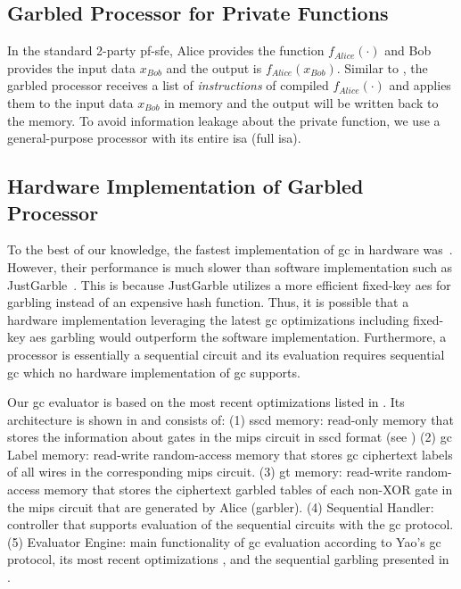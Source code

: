 \subsection{Garbled Processor for Private Functions} \label{ssec:processor-mips-sfe-private}
In the standard 2-party \acrshort{pf-sfe}, Alice provides the function $f_{Alice}(\cdot)$ and Bob provides the input data $x_{Bob}$ and the output is $f_{Alice}(x_{Bob})$.
Similar to , the garbled processor receives a list of \emph{instructions} of compiled $f_{Alice}(\cdot)$ and applies them to the input data $x_{Bob}$ in memory and the output will be written back to the memory.
To avoid information leakage about the private function, we use a general-purpose processor with its entire \acrshort{isa} (full \acrshort{isa}).

\subsection{Hardware Implementation of Garbled Processor} \label{ssec:processor-hardware}
To the best of our knowledge, the fastest implementation of \acrshort{gc} in hardware was~\cite{jarvinen2010garbled}.
However, their performance is much slower than software implementation such as JustGarble~\cite{bellare2013efficient}.
This is because JustGarble utilizes a more efficient fixed-key \acrshort{aes} for garbling instead of an expensive hash function.
Thus, it is possible that a hardware implementation leveraging the latest \acrshort{gc} optimizations including fixed-key \acrshort{aes} garbling would outperform the software implementation.
Furthermore, a processor is essentially a sequential circuit and its evaluation requires sequential \acrshort{gc} which no hardware implementation of \acrshort{gc} supports.

Our \acrshort{gc} evaluator is based on the most recent optimizations listed in .
Its architecture is shown in  and consists of:
(1) \acrfull{sscd} memory: read-only memory that stores the information about gates in the \gls{mips} circuit in \acrshort{sscd} format (see )
(2) \acrshort{gc} Label memory: read-write random-access memory that stores \acrshort{gc} ciphertext labels of all wires in the corresponding \gls{mips} circuit.
(3) \acrfull{gt} memory: read-write random-access memory that stores the ciphertext garbled tables of each non-XOR gate in the \gls{mips} circuit that are generated by Alice (garbler).
(4) Sequential Handler: controller that supports evaluation of the sequential circuits with the \acrshort{gc} protocol.
(5) Evaluator Engine: main functionality of \acrshort{gc} evaluation according to Yao's \acrshort{gc} protocol, its most recent optimizations \cite{kolesnikov2008improved, bellare2013efficient, zahur2015two}, and the sequential garbling presented in .

